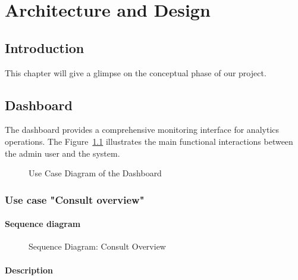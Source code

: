 \chapter{Architecture and Design}

\section*{Introduction}

This chapter will give a glimpse on the conceptual phase of our project.

\vspace{-8pt}
\enlargethispage{3cm}
\section{Dashboard}

\vspace{-5pt}

The dashboard provides a comprehensive monitoring interface for analytics operations. The Figure~\ref{fig:chapter2-1} illustrates the main functional interactions between the admin user and the system.

\vspace{-8pt}

\begin{figure}[H]
\centering
{}
\caption{Use Case Diagram of the Dashboard}
\label{fig:chapter2-1}
\end{figure}

\subsection{Use case "Consult overview"}

\subsubsection{Sequence diagram}

\begin{figure}[H]
\centering
{}
\caption{Sequence Diagram: Consult Overview}
\label{fig:chapter2-consult-overview}
\end{figure}
\vspace{5cm}
\subsubsection{Description}

